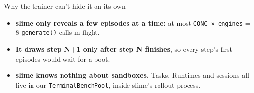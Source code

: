 \documentclass[
  10pt,
  ignorenonframetext,
  aspectratio=169,
  t]{beamer}
\providecommand{\tightlist}{%
  \setlength{\itemsep}{0pt}\setlength{\parskip}{0pt}}
\begin{document}
\begin{frame}[fragile]{Why the trainer can't hide it on its own}
\protect\hypertarget{why-the-trainer-cant-hide-it-on-its-own}{}
\begin{itemize}
\tightlist
\item
  \textbf{slime only reveals a few episodes at a time:} at most
  \texttt{CONC\ ×\ engines} = 8 \texttt{generate()} calls in flight.
\item
  \textbf{It draws step N+1 only after step N finishes}, so every step's
  first episodes would wait for a boot.
\item
  \textbf{slime knows nothing about sandboxes.} Tasks, Runtimes and
  sessions all live in our \texttt{TerminalBenchPool}, inside slime's
  rollout process.
\end{itemize}


\end{frame}
\end{document}
